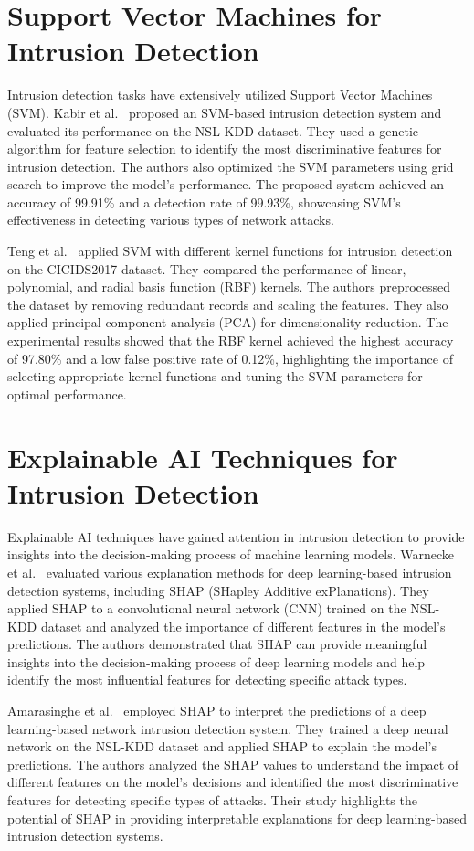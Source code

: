 \section{Support Vector Machines for Intrusion Detection}
Intrusion detection tasks have extensively utilized Support Vector Machines (SVM). Kabir et al.~\cite{kabir2017network} proposed an SVM-based intrusion detection system and evaluated its performance on the NSL-KDD dataset. They used a genetic algorithm for feature selection to identify the most discriminative features for intrusion detection. The authors also optimized the SVM parameters using grid search to improve the model's performance. The proposed system achieved an accuracy of 99.91\% and a detection rate of 99.93\%, showcasing SVM's effectiveness in detecting various types of network attacks.

Teng et al.~\cite{teng2017svm} applied SVM with different kernel functions for intrusion detection on the CICIDS2017 dataset. They compared the performance of linear, polynomial, and radial basis function (RBF) kernels. The authors preprocessed the dataset by removing redundant records and scaling the features. They also applied principal component analysis (PCA) for dimensionality reduction. The experimental results showed that the RBF kernel achieved the highest accuracy of 97.80\% and a low false positive rate of 0.12\%, highlighting the importance of selecting appropriate kernel functions and tuning the SVM parameters for optimal performance.

\section{Explainable AI Techniques for Intrusion Detection}
Explainable AI techniques have gained attention in intrusion detection to provide insights into the decision-making process of machine learning models. Warnecke et al.~\cite{warnecke2020evaluating} evaluated various explanation methods for deep learning-based intrusion detection systems, including SHAP (SHapley Additive exPlanations). They applied SHAP to a convolutional neural network (CNN) trained on the NSL-KDD dataset and analyzed the importance of different features in the model's predictions. The authors demonstrated that SHAP can provide meaningful insights into the decision-making process of deep learning models and help identify the most influential features for detecting specific attack types.

Amarasinghe et al.~\cite{amarasinghe2018toward} employed SHAP to interpret the predictions of a deep learning-based network intrusion detection system. They trained a deep neural network on the NSL-KDD dataset and applied SHAP to explain the model's predictions. The authors analyzed the SHAP values to understand the impact of different features on the model's decisions and identified the most discriminative features for detecting specific types of attacks. Their study highlights the potential of SHAP in providing interpretable explanations for deep learning-based intrusion detection systems.

